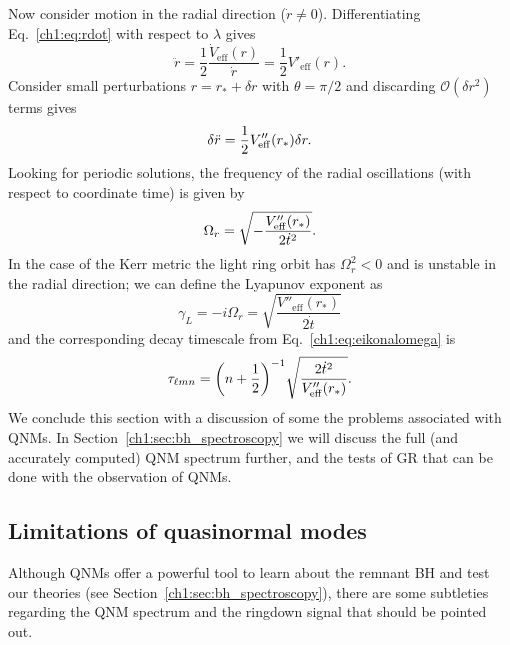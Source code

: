 Now consider motion in the radial direction ($\dot{r} \neq 0$).
Differentiating Eq.~\ref{ch1:eq:rdot} with respect to $\lambda$ gives
\begin{equation}
    \ddot{r} = \frac{1}{2} \frac{\dot{V}_\mathrm{eff}(r)}{\dot{r}} = \frac{1}{2}V'_\mathrm{eff}(r).
\end{equation}
Consider small perturbations $r = r_* + \delta r$ with $\theta = \pi/2$ and discarding $\mathcal{O}(\delta r^2)$ terms gives
\begin{equation}
    \delta \ddot{r} = \frac{1}{2}V''_{\rm eff}(r_*)\delta r.
\end{equation}
Looking for periodic solutions, the frequency of the radial oscillations (with respect to coordinate time) is given by
\begin{equation}
    \Omega_{r} = \sqrt{-\frac{V''_{\rm eff}(r_*)}{2\dot{t}^2}}.
\end{equation}
In the case of the Kerr metric the light ring orbit has $\Omega_r^2 < 0$ and is unstable in the radial direction; we can define the Lyapunov exponent as
\begin{equation}
    \gamma_L = -i\Omega_r = \sqrt{\frac{V''_\mathrm{eff}(r_*)}{2\dot{t}}}
\end{equation}
and the corresponding decay timescale from Eq.~\ref{ch1:eq:eikonalomega} is
\begin{equation}
    \tau_{\ell m n} = \qty(n + \frac{1}{2})^{-1} \sqrt{\frac{2\dot{t}^2}{V''_\mathrm{eff}(r_*)}}.
\end{equation}
We conclude this section with a discussion of some the problems associated with QNMs.
In Section~\ref{ch1:sec:bh_spectroscopy} we will discuss the full (and accurately computed) QNM spectrum further, and the tests of GR that can be done with the observation of QNMs.

\subsection{Limitations of quasinormal modes}
\label{ch1:sec:limitations}

Although QNMs offer a powerful tool to learn about the remnant BH and test our theories (see Section~\ref{ch1:sec:bh_spectroscopy}), there are some subtleties regarding the QNM spectrum and the ringdown signal that should be pointed out. 

